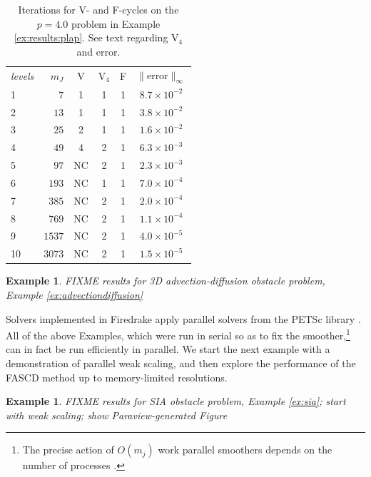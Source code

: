 \documentclass[letterpaper,final,12pt,reqno]{amsart}
\theoremstyle{cstyle}
\theoremstyle{cstyle*}
\theoremstyle{dstyle}
\newtheorem{example}[theorem]{Example}
\numberwithin{equation}{section}
\numberwithin{figure}{section}
\numberwithin{table}{section}
\numberwithin{theorem}{section}
\begin{document}
\begin{table}[ht]
\begin{tabular}{lr@{\hskip 7mm}c@{\hskip 4mm}c@{\hskip 4mm}c@{\hskip 6mm}c}
\emph{levels} & $m_J$ & V & V$_4$ & F & $\|$error$\|_\infty$ \\ \cmidrule{1-6}
 1 &    $7$ &  1 &  1 &  1 & $8.7 \times 10^{-2}$ \\
 2 &   $13$ &  1 &  1 &  1 & $3.8 \times 10^{-2}$ \\
 3 &   $25$ &  2 &  1 &  1 & $1.6 \times 10^{-2}$ \\
 4 &   $49$ &  4 &  2 &  1 & $6.3 \times 10^{-3}$ \\
 5 &   $97$ & NC &  2 &  1 & $2.3 \times 10^{-3}$ \\
 6 &  $193$ & NC &  1 &  1 & $7.0 \times 10^{-4}$ \\
 7 &  $385$ & NC &  2 &  1 & $2.0 \times 10^{-4}$ \\
 8 &  $769$ & NC &  2 &  1 & $1.1 \times 10^{-4}$ \\
 9 & $1537$ & NC &  2 &  1 & $4.0 \times 10^{-5}$ \\
10 & $3073$ & NC &  2 &  1 & $1.5 \times 10^{-5}$
\end{tabular}
\bigskip
\caption{Iterations for V- and F-cycles on the $p=4.0$ problem in Example \ref{ex:results:plap}.  See text regarding V$_4$ and error.}
\label{tab:results:degenerateplap1d}
\end{table}


\begin{example}  \label{ex:results:advdiff}
FIXME results for 3D advection-diffusion obstacle problem, Example \ref{ex:advectiondiffusion}
\end{example}

Solvers implemented in Firedrake apply parallel solvers from the PETSc library \cite{Balayetal2023}.  All of the above Examples, which were run in serial so as to fix the smoother,\footnote{The precise action of $O(m_j)$ work parallel smoothers depends on the number of processes \cite[for example]{Bueler2021}.} can in fact be run efficiently in parallel.  We start the next example with a demonstration of parallel weak scaling, and then explore the performance of the FASCD method up to memory-limited resolutions.

\begin{example}   \label{ex:results:sia}
FIXME results for SIA obstacle problem, Example \ref{ex:sia}; start with weak scaling; show Paraview-generated Figure
\end{example}
\end{document}
